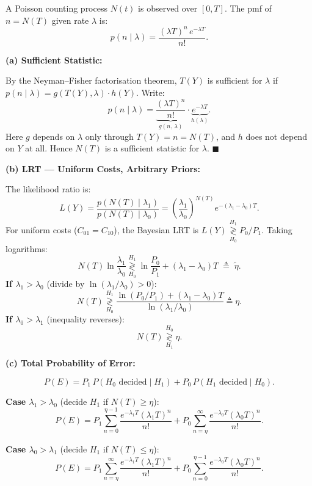 \documentclass[12pt,a4paper,onecolumn]{exam}
\begin{document}
\begin{solution}

A Poisson counting process $N(t)$ is observed over $[0,T]$. The pmf of $n=N(T)$ given rate $\lambda$ is:
\[
p(n \mid \lambda) = \frac{(\lambda T)^{n}\,e^{-\lambda T}}{n!}.
\]

\textbf{(a) Sufficient Statistic:}

By the Neyman--Fisher factorisation theorem, $T(Y)$ is sufficient for $\lambda$ if
$p(n\mid\lambda) = g(T(Y),\lambda)\cdot h(Y)$.
Write:
\[
p(n\mid\lambda) = \underbrace{\frac{(\lambda T)^{n}}{n!}}_{g(n,\,\lambda)} \cdot \underbrace{e^{-\lambda T}}_{h(\lambda)}.
\]
Here $g$ depends on $\lambda$ only through $T(Y)=n=N(T)$, and $h$ does not depend on $Y$ at all.
Hence $N(T)$ is a sufficient statistic for $\lambda$. $\blacksquare$

\textbf{(b) LRT --- Uniform Costs, Arbitrary Priors:}

The likelihood ratio is:
\[
L(Y) = \frac{p(N(T)\mid\lambda_1)}{p(N(T)\mid\lambda_0)}
= \left(\frac{\lambda_1}{\lambda_0}\right)^{N(T)} e^{-(\lambda_1-\lambda_0)T}.
\]
For uniform costs ($C_{01}=C_{10}$), the Bayesian LRT is $L(Y)\underset{H_0}{\overset{H_1}{\gtrless}} P_0/P_1$.
Taking logarithms:
\[
N(T)\ln\frac{\lambda_1}{\lambda_0} \underset{H_0}{\overset{H_1}{\gtrless}} \ln\frac{P_0}{P_1} + (\lambda_1-\lambda_0)T \;\triangleq\; \tilde{\eta}.
\]
\textbf{If $\lambda_1>\lambda_0$} (divide by $\ln(\lambda_1/\lambda_0)>0$):
\[
N(T) \underset{H_0}{\overset{H_1}{\gtrless}}
\frac{\ln(P_0/P_1)+(\lambda_1-\lambda_0)T}{\ln(\lambda_1/\lambda_0)} \triangleq \eta.
\]
\textbf{If $\lambda_0>\lambda_1$} (inequality reverses):
\[
N(T) \underset{H_1}{\overset{H_0}{\gtrless}} \eta.
\]

\textbf{(c) Total Probability of Error:}

\[
P(E) = P_1\,P(H_0\text{ decided}\mid H_1) + P_0\,P(H_1\text{ decided}\mid H_0).
\]

\textbf{Case $\lambda_1>\lambda_0$} (decide $H_1$ if $N(T)\geq\eta$):
\[
P(E) = P_1\sum_{n=0}^{\eta-1}\frac{e^{-\lambda_1 T}(\lambda_1 T)^{n}}{n!}
      + P_0\sum_{n=\eta}^{\infty}\frac{e^{-\lambda_0 T}(\lambda_0 T)^{n}}{n!}.
\]

\textbf{Case $\lambda_0>\lambda_1$} (decide $H_1$ if $N(T)\leq\eta$):
\[
P(E) = P_1\sum_{n=\eta}^{\infty}\frac{e^{-\lambda_1 T}(\lambda_1 T)^{n}}{n!}
      + P_0\sum_{n=0}^{\eta-1}\frac{e^{-\lambda_0 T}(\lambda_0 T)^{n}}{n!}.
\]

\end{solution}
\end{document}
